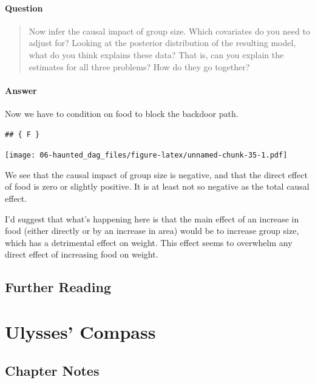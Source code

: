 \documentclass[
]{book}
\begin{document}
\hypertarget{question-59}{%
\subsubsection*{Question}\label{question-59}}

\begin{quote}
Now infer the causal impact of group size. Which covariates do you need to adjust for? Looking at the posterior distribution of the resulting model, what do you think explains these data? That is, can you explain the estimates for all three problems? How do they go together?
\end{quote}

\hypertarget{answer-59}{%
\subsubsection*{Answer}\label{answer-59}}

Now we have to condition on food to block the backdoor path.

\begin{verbatim}
## { F }
\end{verbatim}

\texttt{[image: 06-haunted\_dag\_files/figure-latex/unnamed-chunk-35-1.pdf]}

We see that the causal impact of group size is negative, and that the direct effect of food is zero or slightly positive. It is at least not so negative as the total causal effect.

I'd suggest that what's happening here is that the main effect of an increase in food (either directly or by an increase in area) would be to increase group size, which has a detrimental effect on weight. This effect seems to overwhelm any direct effect of increasing food on weight.

\hypertarget{further-reading-5}{%
\section*{Further Reading}\label{further-reading-5}}

\hypertarget{ulysses}{%
\chapter{Ulysses' Compass}\label{ulysses}}

\hypertarget{chapter-notes-6}{%
\section{Chapter Notes}\label{chapter-notes-6}}
\end{document}
